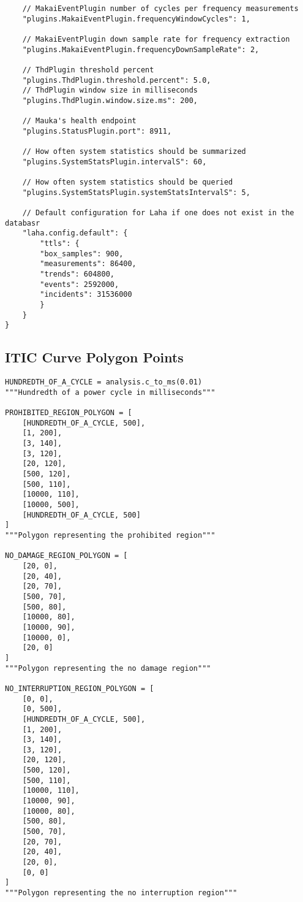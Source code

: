 \begin{verbatim}
	// MakaiEventPlugin number of cycles per frequency measurements
	"plugins.MakaiEventPlugin.frequencyWindowCycles": 1,

	// MakaiEventPlugin down sample rate for frequency extraction
	"plugins.MakaiEventPlugin.frequencyDownSampleRate": 2,

	// ThdPlugin threshold percent
	"plugins.ThdPlugin.threshold.percent": 5.0,
	// ThdPlugin window size in milliseconds
	"plugins.ThdPlugin.window.size.ms": 200,

	// Mauka's health endpoint
	"plugins.StatusPlugin.port": 8911,

	// How often system statistics should be summarized
	"plugins.SystemStatsPlugin.intervalS": 60,

	// How often system statistics should be queried
	"plugins.SystemStatsPlugin.systemStatsIntervalS": 5,

	// Default configuration for Laha if one does not exist in the databasr
	"laha.config.default": {
		"ttls": {
		"box_samples": 900,
		"measurements": 86400,
		"trends": 604800,
		"events": 2592000,
		"incidents": 31536000
		}
	}
}
\end{verbatim}

\subsection{ITIC Curve Polygon Points}
\label{appendix:Itic}
\begin{verbatim}
HUNDREDTH_OF_A_CYCLE = analysis.c_to_ms(0.01)
"""Hundredth of a power cycle in milliseconds"""

PROHIBITED_REGION_POLYGON = [
	[HUNDREDTH_OF_A_CYCLE, 500],
	[1, 200],
	[3, 140],
	[3, 120],
	[20, 120],
	[500, 120],
	[500, 110],
	[10000, 110],
	[10000, 500],
	[HUNDREDTH_OF_A_CYCLE, 500]
]
"""Polygon representing the prohibited region"""

NO_DAMAGE_REGION_POLYGON = [
	[20, 0],
	[20, 40],
	[20, 70],
	[500, 70],
	[500, 80],
	[10000, 80],
	[10000, 90],
	[10000, 0],
	[20, 0]
]
"""Polygon representing the no damage region"""

NO_INTERRUPTION_REGION_POLYGON = [
	[0, 0],
	[0, 500],
	[HUNDREDTH_OF_A_CYCLE, 500],
	[1, 200],
	[3, 140],
	[3, 120],
	[20, 120],
	[500, 120],
	[500, 110],
	[10000, 110],
	[10000, 90],
	[10000, 80],
	[500, 80],
	[500, 70],
	[20, 70],
	[20, 40],
	[20, 0],
	[0, 0]
]
"""Polygon representing the no interruption region"""
\end{verbatim}

